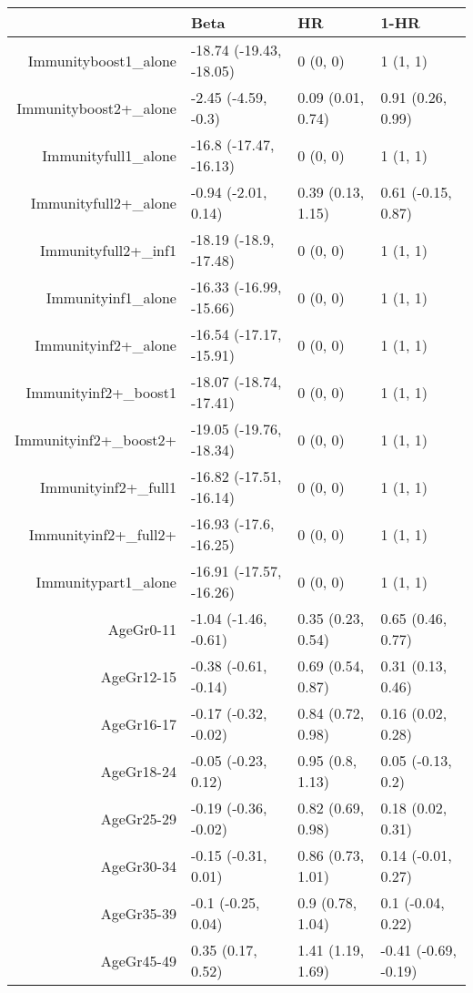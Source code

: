 \begin{table}[ht]
\centering
\begin{tabular}{rlll}
  \hline
 & Beta & HR & 1-HR \\ 
  \hline
Immunityboost1\_alone & -18.74 (-19.43, -18.05) & 0 (0, 0) & 1 (1, 1) \\ 
  Immunityboost2+\_alone & -2.45 (-4.59, -0.3) & 0.09 (0.01, 0.74) & 0.91 (0.26, 0.99) \\ 
  Immunityfull1\_alone & -16.8 (-17.47, -16.13) & 0 (0, 0) & 1 (1, 1) \\ 
  Immunityfull2+\_alone & -0.94 (-2.01, 0.14) & 0.39 (0.13, 1.15) & 0.61 (-0.15, 0.87) \\ 
  Immunityfull2+\_inf1 & -18.19 (-18.9, -17.48) & 0 (0, 0) & 1 (1, 1) \\ 
  Immunityinf1\_alone & -16.33 (-16.99, -15.66) & 0 (0, 0) & 1 (1, 1) \\ 
  Immunityinf2+\_alone & -16.54 (-17.17, -15.91) & 0 (0, 0) & 1 (1, 1) \\ 
  Immunityinf2+\_boost1 & -18.07 (-18.74, -17.41) & 0 (0, 0) & 1 (1, 1) \\ 
  Immunityinf2+\_boost2+ & -19.05 (-19.76, -18.34) & 0 (0, 0) & 1 (1, 1) \\ 
  Immunityinf2+\_full1 & -16.82 (-17.51, -16.14) & 0 (0, 0) & 1 (1, 1) \\ 
  Immunityinf2+\_full2+ & -16.93 (-17.6, -16.25) & 0 (0, 0) & 1 (1, 1) \\ 
  Immunitypart1\_alone & -16.91 (-17.57, -16.26) & 0 (0, 0) & 1 (1, 1) \\ 
  AgeGr0-11 & -1.04 (-1.46, -0.61) & 0.35 (0.23, 0.54) & 0.65 (0.46, 0.77) \\ 
  AgeGr12-15 & -0.38 (-0.61, -0.14) & 0.69 (0.54, 0.87) & 0.31 (0.13, 0.46) \\ 
  AgeGr16-17 & -0.17 (-0.32, -0.02) & 0.84 (0.72, 0.98) & 0.16 (0.02, 0.28) \\ 
  AgeGr18-24 & -0.05 (-0.23, 0.12) & 0.95 (0.8, 1.13) & 0.05 (-0.13, 0.2) \\ 
  AgeGr25-29 & -0.19 (-0.36, -0.02) & 0.82 (0.69, 0.98) & 0.18 (0.02, 0.31) \\ 
  AgeGr30-34 & -0.15 (-0.31, 0.01) & 0.86 (0.73, 1.01) & 0.14 (-0.01, 0.27) \\ 
  AgeGr35-39 & -0.1 (-0.25, 0.04) & 0.9 (0.78, 1.04) & 0.1 (-0.04, 0.22) \\ 
  AgeGr45-49 & 0.35 (0.17, 0.52) & 1.41 (1.19, 1.69) & -0.41 (-0.69, -0.19) \\ 

\end{tabular}
\end{table}
